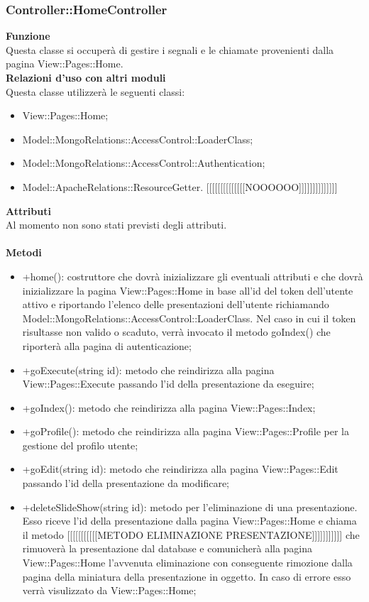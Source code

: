 {			\subsubsection{Controller::HomeController}{
					\label{sub:homecontroller}
					\textbf{Funzione}\\
					\indent Questa classe si occuperà di gestire i segnali e le chiamate provenienti dalla pagina View::Pages::Home.\\
					\textbf{Relazioni d'uso con altri moduli}\\
					\indent Questa classe utilizzerà le seguenti classi:
					\begin{itemize}
						\item View::Pages::Home;
						\item Model::MongoRelations::AccessControl::LoaderClass;
						\item Model::MongoRelations::AccessControl::Authentication;
						\item Model::ApacheRelations::ResourceGetter. [[[[[[[[[[[[[[NOOOOOO]]]]]]]]]]]]]]
					\end{itemize}
					\textbf{Attributi}\\
					\indent Al momento non sono stati previsti degli attributi.\\\\
					\textbf{Metodi}
					\begin{itemize}
						\item +home(): costruttore che dovrà inizializzare gli eventuali attributi e che dovrà inizializzare la pagina View::Pages::Home in base all'id del token dell'utente attivo e riportando l'elenco delle presentazioni dell'utente richiamando Model::MongoRelations::AccessControl::LoaderClass. Nel caso in cui il token risultasse non valido o scaduto, verrà invocato il metodo goIndex() che riporterà alla pagina di autenticazione;
						\item +goExecute(string id): metodo che reindirizza alla pagina View::Pages::Execute passando l'id della presentazione da eseguire;
						\item +goIndex(): metodo che reindirizza alla pagina View::Pages::Index;
						\item +goProfile(): metodo che reindirizza alla pagina View::Pages::Profile per la gestione del profilo utente;
						\item +goEdit(string id): metodo che reindirizza alla pagina View::Pages::Edit passando l'id della presentazione da modificare;
						\item +deleteSlideShow(string id): metodo per l'eliminazione di una presentazione. Esso riceve l'id della presentazione dalla pagina View::Pages::Home e chiama il metodo [[[[[[[[[[[METODO ELIMINAZIONE PRESENTAZIONE]]]]]]]]]]] che rimuoverà la presentazione dal database e comunicherà alla pagina View::Pages::Home l'avvenuta eliminazione con conseguente rimozione dalla pagina della miniatura della presentazione in oggetto. In caso di errore esso verrà visulizzato da View::Pages::Home; 

\end{itemize}}}
